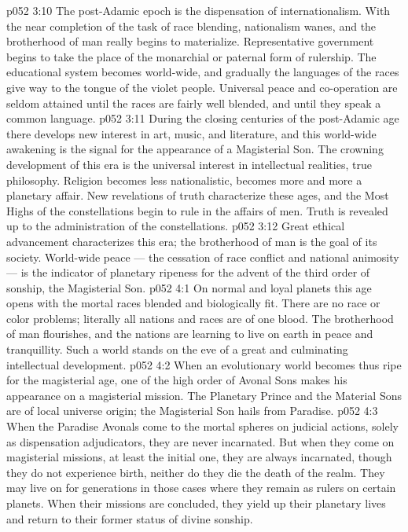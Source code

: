 \vs p052 3:10 \pc The post\hyp{}Adamic epoch is the dispensation of internationalism. With the near completion of the task of race blending, nationalism wanes, and the brotherhood of man really begins to materialize. Representative government begins to take the place of the monarchial or paternal form of rulership. The educational system becomes world\hyp{}wide, and gradually the languages of the races give way to the tongue of the violet people. Universal peace and co\hyp{}operation are seldom attained until the races are fairly well blended, and until they speak a common language.
\vs p052 3:11 During the closing centuries of the post\hyp{}Adamic age there develops new interest in art, music, and literature, and this world\hyp{}wide awakening is the signal for the appearance of a Magisterial Son. The crowning development of this era is the universal interest in intellectual realities, true philosophy. Religion becomes less nationalistic, becomes more and more a planetary affair. New revelations of truth characterize these ages, and the Most Highs of the constellations begin to rule in the affairs of men. Truth is revealed up to the administration of the constellations.
\vs p052 3:12 Great ethical advancement characterizes this era; the brotherhood of man is the goal of its society. World\hyp{}wide peace --- the cessation of race conflict and national animosity --- is the indicator of planetary ripeness for the advent of the third order of sonship, the Magisterial Son.
\vs p052 4:1 On normal and loyal planets this age opens with the mortal races blended and biologically fit. There are no race or color problems; literally all nations and races are of one blood. The brotherhood of man flourishes, and the nations are learning to live on earth in peace and tranquillity. Such a world stands on the eve of a great and culminating intellectual development.
\vs p052 4:2 \pc When an evolutionary world becomes thus ripe for the magisterial age, one of the high order of Avonal Sons makes his appearance on a magisterial mission. The Planetary Prince and the Material Sons are of local universe origin; the Magisterial Son hails from Paradise.
\vs p052 4:3 When the Paradise Avonals come to the mortal spheres on judicial actions, solely as dispensation adjudicators, they are never incarnated. But when they come on magisterial missions, at least the initial one, they are always incarnated, though they do not experience birth, neither do they die the death of the realm. They may live on for generations in those cases where they remain as rulers on certain planets. When their missions are concluded, they yield up their planetary lives and return to their former status of divine sonship.
